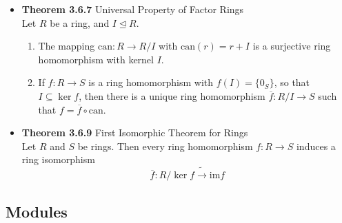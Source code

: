 \documentclass[11pt,a4paper]{article}
\begin{document}
\begin{itemize}
    \item \textbf{Theorem 3.6.7} Universal Property of Factor Rings \\
        Let $R$ be a ring, and $I \trianglelefteq R$.
        \begin{enumerate}
            \item The mapping $\mathrm{can}: R \to R / I$ with $\mathrm{can}(r) = r + I$
                is a surjective ring homomorphism with kernel $I$.
            \item If $f : R \to S$ is a ring homomorphism with $f(I) = \{0_S\}$,
                so that $I \subseteq \ker f$, then there is a unique ring homomorphism
                $\overline{f}: R / I \to S$ such that $f = \overline{f} \circ \mathrm{can}$.
        \end{enumerate}

    \item \textbf{Theorem 3.6.9} First Isomorphic Theorem for Rings \\
        Let $R$ and $S$ be rings.
        Then every ring homomorphism $f: R \to S$ induces a ring isomorphism
        \[
            \overline{f} : R / \ker f \tilde{\to} \mathrm{im} f
        \]
\end{itemize}

\subsection{Modules}
\end{document}
